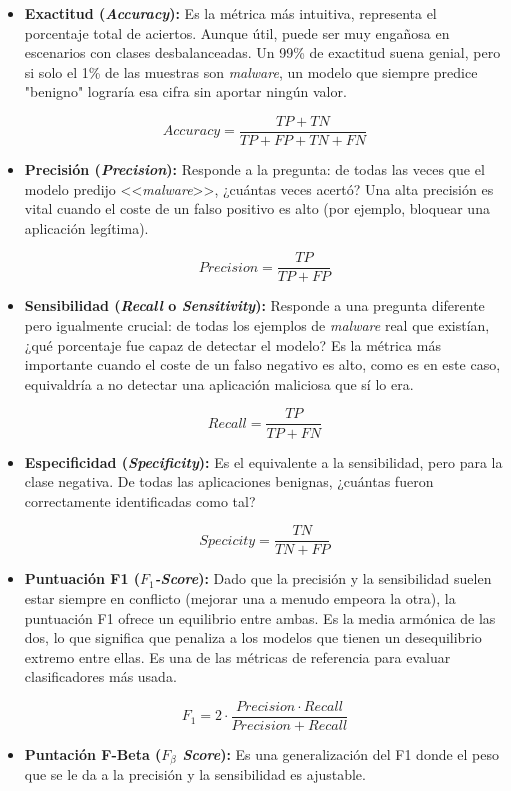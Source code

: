 \begin{itemize}
	\item \textbf{Exactitud (\textit{Accuracy}):} Es la métrica más intuitiva, representa el porcentaje total de aciertos. Aunque útil, puede ser muy engañosa en escenarios con clases desbalanceadas. Un 99\% de exactitud suena genial, pero si solo el 1\% de las muestras son \textit{malware}, un modelo que siempre predice "benigno" lograría esa cifra sin aportar ningún valor.

	\[Accuracy =\frac{TP + TN}{TP + FP + TN + FN}\]
	
	\item \textbf{Precisión (\textit{Precision}):} Responde a la pregunta: de todas las veces que el modelo predijo <<\textit{malware}>>, ¿cuántas veces acertó? Una alta precisión es vital cuando el coste de un falso positivo es alto (por ejemplo, bloquear una aplicación legítima).

	\[Precision = \frac{TP}{TP + FP}\]

	\item \textbf{Sensibilidad (\textit{Recall} o \textit{Sensitivity}):} Responde a una pregunta diferente pero igualmente crucial: de todas los ejemplos de \textit{malware} real que existían, ¿qué porcentaje fue capaz de detectar el modelo? Es la métrica más importante cuando el coste de un falso negativo es alto, como es en este caso, equivaldría a no detectar una aplicación maliciosa que sí lo era.
	
	\[Recall = \frac{TP}{TP + FN}\]
	
	\item \textbf{Especificidad (\textit{Specificity}):} Es el equivalente a la sensibilidad, pero para la clase negativa. De todas las aplicaciones benignas, ¿cuántas fueron correctamente identificadas como tal?
	
	\[Specicity = \frac{TN}{TN + FP}\]
	
	\item \textbf{Puntuación F1 (\textit{$F_1$-Score}):} Dado que la precisión y la sensibilidad suelen estar siempre en conflicto (mejorar una a menudo empeora la otra), la puntuación F1 ofrece un equilibrio entre ambas. Es la media armónica de las dos, lo que significa que penaliza a los modelos que tienen un desequilibrio extremo entre ellas. Es una de las métricas de referencia para evaluar clasificadores más usada.
	
	\[F_1 = 2 \cdot \frac{Precision \cdot Recall}{Precision + Recall}\]
	
	\item \textbf{Puntación F-Beta (\textit{$F_\beta$ Score}):} Es una generalización del F1 donde el peso que se le da a la precisión y la sensibilidad es ajustable.
	

\end{itemize}
